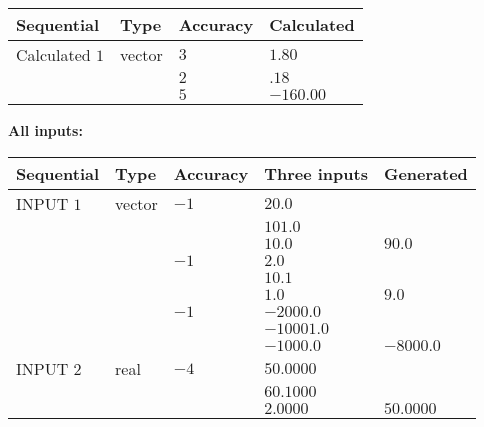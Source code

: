 \documentclass[12pt]{article}
\begin{document}
   
   
   
\noindent{}
   
   
  
  
\noindent\begin{tabular}{|l|l|l|l|}
\hline
 Sequential & Type & Accuracy & Calculated \\ 
\hline
 
 
  Calculated $           1$ & vector &  
  $           3 $ 
 &  $ 1.80 $ 
 \\    
  & & 
  $           2 $ 
 &  $ .18 $ 
 \\    
  & & 
  $           5 $ 
 &  $ -160.00 $ 
 \\  \hline  
 \end{tabular}
   
   
   
   
\noindent\vspace{0.1in}\hspace{-0.08in} {\textbf{\Large{All inputs: }}}
   
   
  
  
\noindent\begin{tabular}{|l|l|l|l|l|}
\hline
 Sequential & Type & Accuracy & Three inputs & Generated \\ 
\hline
 
 
  INPUT $           1$ & vector & $          -1 $ & $
20.0
  $ & \\
  & & & $
101.0
  $ & \\
  & & & $
10.0
$ & $ 90.0 $ 
  \\
  & & $          -1 $ & $
2.0
  $ & \\
  & & & $
10.1
  $ & \\
  & & & $
1.0
$ & $ 9.0 $ 
  \\
  & & $          -1 $ & $
-2000.0
  $ & \\
  & & & $
-10001.0
  $ & \\
  & & & $
-1000.0
$ & $ -8000.0 $ 
 \\  \hline  
 
 
  INPUT $           2$ & real & $          -4 $ & $
 50.0000
  $ & \\
  & & &  $
 60.1000
  $ & \\
  & & &  $
 2.0000
 $ & $ 50.0000 $ 
 \\  \hline  
 \end{tabular}
   
   
  
\vspace{0.2in}
  
\end{document}
